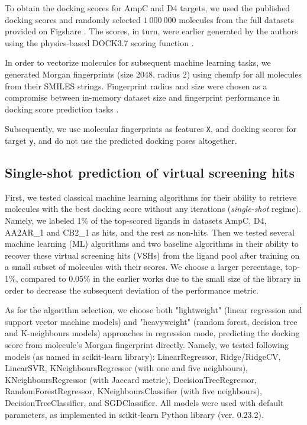 To obtain the docking scores for AmpC and D4 targets, we used the published docking scores \cite{ultralarge_docking_first} and randomly selected $1\ 000\ 000$ molecules from the full datasets provided on Figshare \cite{ultralarge_docking_first}. The scores, in turn, were earlier generated by the authors using the physics-based DOCK3.7 scoring function \cite{Coleman2013}.

In order to vectorize molecules for subsequent machine learning tasks, we generated Morgan fingerprints (size 2048, radius 2) using chemfp \cite{Dalke2019} for all molecules from their SMILES strings. Fingerprint radius and size were chosen as a compromise between in-memory dataset size and fingerprint performance in docking score prediction tasks \cite{logistic_regression}.

Subsequently, we use molecular fingerprints as features \texttt{X}, and docking scores for target \texttt{y}, and do not use the predicted docking poses altogether.

\subsection{Single-shot prediction of virtual screening hits}
First, we tested classical machine learning algorithms for their ability to retrieve molecules with the best docking score without any iterations (\textit{single-shot} regime). Namely, we labeled 1\% of the top-scored ligands in datasets AmpC, D4, AA2AR\_1 and CB2\_1 as hits, and the rest as non-hits. Then we tested several machine learning (ML) algorithms and two baseline algorithms in their ability to recover these virtual screening hits (VSHs) from the ligand pool after training on a small subset of molecules with their scores. We choose a larger percentage, top-1\%, compared to 0.05\% in the earlier works  \cite{Graff2021AcceleratingLearning, logistic_regression, Yang2021_shoichet_active_learning} due to the small size of the library in order to decrease the subsequent deviation of the performance metric.

As for the algorithm selection, we choose both "lightweight" (linear regression and support vector machine models) and "heavyweight" (random forest, decision tree and K-neighbours models) approaches in regression mode, predicting the docking score from molecule's Morgan fingerprint directly. Namely, we tested following models (as named in scikit-learn library): LinearRegressor, Ridge/RidgeCV, LinearSVR, KNeighboursRegressor (with one and five neighbours), KNeighboursRegressor (with Jaccard metric), DecisionTreeRegressor, RandomForestRegressor, KNeighboursClassifier (with five neighbours), DecisionTreeClassifier, and SGDClassifier. All models were used with default parameters, as implemented in scikit-learn Python library \cite{scikit-learn} (ver. 0.23.2).

